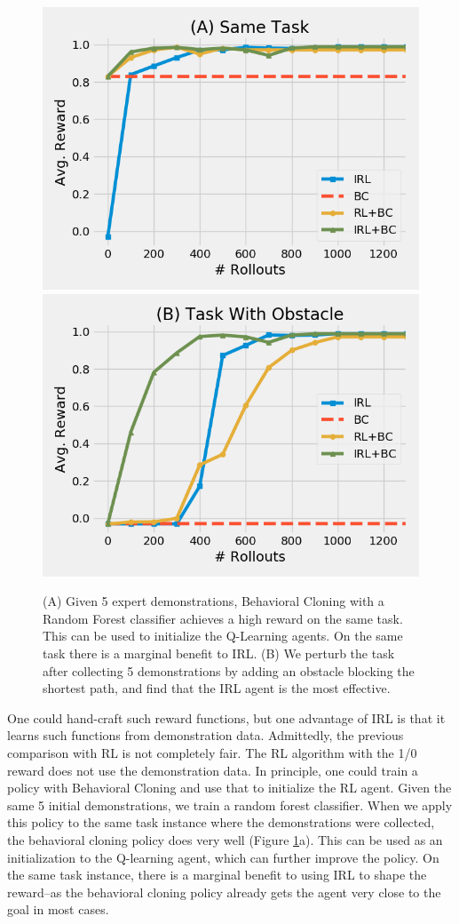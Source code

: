 \begin{figure}[t]
\centering
 \includegraphics[width=0.48\columnwidth]{concept/3.png}
  \includegraphics[width=0.48\columnwidth]{concept/4.png}
 \caption{(A) Given 5 expert demonstrations, Behavioral Cloning with a Random Forest classifier achieves a high reward on the same task. This can be used to initialize the Q-Learning agents. On the same task there is a marginal benefit to IRL. (B) We perturb the task after collecting 5 demonstrations by adding an obstacle blocking the shortest path, and find that the IRL agent is the most effective.  \label{concept:3}}
\end{figure}

One could hand-craft such reward functions, but one advantage of IRL is that it learns such functions from demonstration data. Admittedly, the previous comparison with RL is not completely fair. The RL algorithm with the 1/0 reward does not use the demonstration data. In principle, one could train a policy with Behavioral Cloning and use that to initialize the RL agent. Given the same 5 initial demonstrations, we train a random forest classifier.
When we apply this policy to the same task instance where the demonstrations were collected, the behavioral cloning policy does very well (Figure \ref{concept:3}a).
This can be used as an initialization to the Q-learning agent, which can further improve the policy.
On the same task instance, there is a marginal benefit to using IRL to shape the reward--as the behavioral cloning policy already gets the agent very close to the goal in most cases.

